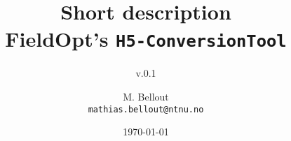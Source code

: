 








\title{\textbf{Short description\\FieldOpt's \texttt{H5-ConversionTool}}}
\subtitle{v.0.1}

\author{
M. Bellout\\
\texttt{mathias.bellout@ntnu.no}
} 

\date{\today}

\maketitle










% 
% 
% 
% 
% 

